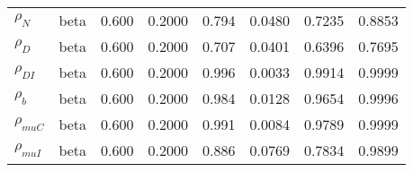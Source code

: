 \begin{center}
\begin{longtable}{llcccccc}
${\rho_N}$ & beta &   0.600 & 0.2000 &   0.794& 0.0480 &  0.7235 &  0.8853 \\ 
${\rho_D}$ & beta &   0.600 & 0.2000 &   0.707& 0.0401 &  0.6396 &  0.7695 \\ 
${\rho_{DI}}$ & beta &   0.600 & 0.2000 &   0.996& 0.0033 &  0.9914 &  0.9999 \\ 
${\rho_b}$ & beta &   0.600 & 0.2000 &   0.984& 0.0128 &  0.9654 &  0.9996 \\ 
${\rho_{muC}}$ & beta &   0.600 & 0.2000 &   0.991& 0.0084 &  0.9789 &  0.9999 \\ 
${\rho_{muI}}$ & beta &   0.600 & 0.2000 &   0.886& 0.0769 &  0.7834 &  0.9899 \\ 
\end{longtable}
 \end{center}

